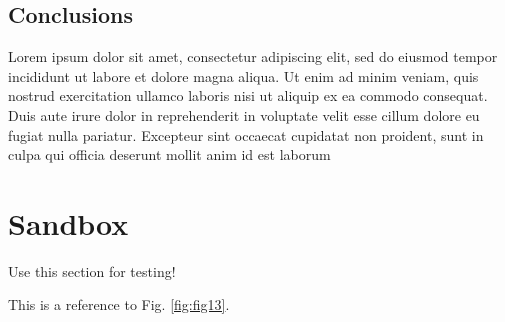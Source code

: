 \documentclass[]{book}
\theoremstyle{definition}
\theoremstyle{definition}
\theoremstyle{definition}
\theoremstyle{remark}
\begin{document}
\section{Conclusions}\label{conclusions}

Lorem ipsum dolor sit amet, consectetur adipiscing elit, sed do eiusmod
tempor incididunt ut labore et dolore magna aliqua. Ut enim ad minim
veniam, quis nostrud exercitation ullamco laboris nisi ut aliquip ex ea
commodo consequat. Duis aute irure dolor in reprehenderit in voluptate
velit esse cillum dolore eu fugiat nulla pariatur. Excepteur sint
occaecat cupidatat non proident, sunt in culpa qui officia deserunt
mollit anim id est laborum

\chapter{Sandbox}\label{sandbox}

Use this section for testing!

This is a reference to Fig. \ref{fig:fig13}.


\end{document}
